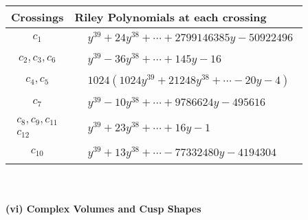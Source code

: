 \documentclass[1p]{elsarticle_modified}
\theoremstyle{definition}
\begin{document}
\begin{tabular}{m{50pt}|m{274pt}}
Crossings & \hspace{64pt}Riley Polynomials at each crossing \\
\hline $$\begin{aligned}c_{1}\end{aligned}$$&$\begin{aligned}
&y^{39}+24 y^{38}+\cdots+2799146385 y-50922496
\end{aligned}$\\
\hline $$\begin{aligned}c_{2},c_{3},c_{6}\end{aligned}$$&$\begin{aligned}
&y^{39}-36 y^{38}+\cdots+145 y-16
\end{aligned}$\\
\hline $$\begin{aligned}c_{4},c_{5}\end{aligned}$$&$\begin{aligned}
&1024(1024 y^{39}+21248 y^{38}+\cdots-20 y-4)
\end{aligned}$\\
\hline $$\begin{aligned}c_{7}\end{aligned}$$&$\begin{aligned}
&y^{39}-10 y^{38}+\cdots+9786624 y-495616
\end{aligned}$\\
\hline $$\begin{aligned}c_{8},c_{9},c_{11}\\c_{12}\end{aligned}$$&$\begin{aligned}
&y^{39}+23 y^{38}+\cdots+16 y-1
\end{aligned}$\\
\hline $$\begin{aligned}c_{10}\end{aligned}$$&$\begin{aligned}
&y^{39}+13 y^{38}+\cdots-77332480 y-4194304
\end{aligned}$\\
\hline
\end{tabular}\\~\\
\newpage\flushleft \textbf{(vi) Complex Volumes and Cusp Shapes}
\end{document}
